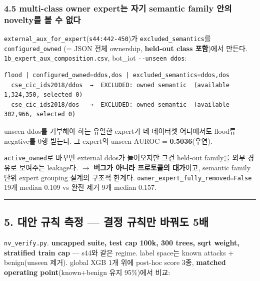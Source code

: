 \subsubsection{4.5 multi-class owner expert는 자기 semantic family 안의 novelty를 볼 수 없다}
\texttt{external\allowbreak{}\_\allowbreak{}\allowbreak{}aux\_\allowbreak{}\allowbreak{}for\allowbreak{}\_\allowbreak{}\allowbreak{}expert}(\texttt{s44:442-\allowbreak{}450})가 \texttt{excluded\allowbreak{}\_\allowbreak{}\allowbreak{}semanti\allowbreak{}cs}를 \texttt{configur\allowbreak{}ed\_\allowbreak{}\allowbreak{}owned\allowbreak{}} (=\allowbreak{} JSON 전체 ownership, \textbf{held-out class 포함})에서 만든다. \texttt{1b\_\allowbreak{}\allowbreak{}exper\allowbreak{}t\_\allowbreak{}\allowbreak{}aux\_\allowbreak{}\allowbreak{}co\allowbreak{}mpositio\allowbreak{}n.\allowbreak{}csv}, bot\_\allowbreak{}iot \texttt{-\allowbreak{}-\allowbreak{}unseen\allowbreak{} ddos}:


\begin{Verbatim}[breaklines=true,breakanywhere=true,fontsize=\scriptsize]
flood | configured_owned=ddos,dos | excluded_semantics=ddos,dos
  cse_cic_ids2018/ddos  →  EXCLUDED: owned semantic  (available 1,324,350, selected 0)
  cse_cic_ids2018/dos   →  EXCLUDED: owned semantic  (available   302,966, selected 0)

\end{Verbatim}
unseen ddos를 거부해야 하는 유일한 expert가 네 데이터셋 어디에서도 flood류 negative를 0행 받는다. 그 expert의 unseen AUROC =\allowbreak{} \textbf{0.5036}(우연).

\texttt{active\_\allowbreak{}\allowbreak{}o\allowbreak{}wned}로 바꾸면 external ddos가 들어오지만 그건 held-out family를 외부 경유로 보여주는 leakage다.  \ensuremath{\rightarrow}  \textbf{버그가 아니라 프로토콜의 대가}이고, semantic family 단위 expert grouping 설계의 구조적 한계다. \texttt{owner\_\allowbreak{}\allowbreak{}ex\allowbreak{}pert\_\allowbreak{}\allowbreak{}ful\allowbreak{}ly\_\allowbreak{}\allowbreak{}remov\allowbreak{}ed=\allowbreak{}\allowbreak{}False\allowbreak{}} 19개 median 0.109 vs 완전 제거 9개 median 0.157.


\medskip\hrule\medskip
\subsection{5. 대안 규칙 측정 — 결정 규칙만 바꿔도 5배}
\texttt{nv\_\allowbreak{}\allowbreak{}verif\allowbreak{}y.\allowbreak{}py}. \textbf{uncapped suite, test cap 100k, 300 trees, sqrt weight, stratified train cap} — s44와 같은 regime. label space는 known attacks +\allowbreak{} benign(unseen 제거). global XGB 1개 위에 post-hoc score 3종, \textbf{matched operating point}(known+\allowbreak{}benign 유지 95\%)에서 비교:

